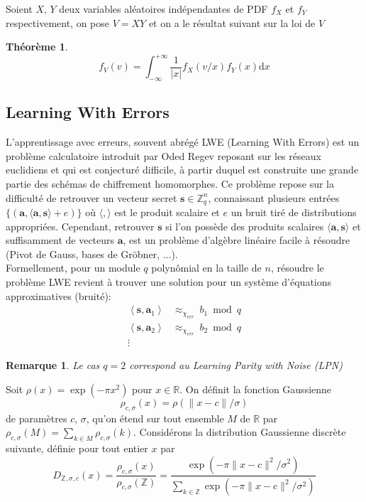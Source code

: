 \documentclass[11pt, headsepline, a4paper, fleqn, oneside]{article}
\newtheorem{theo}{Théorème}
\newtheorem{rem}{Remarque}
\newcommand{\Z}{\mathbb{Z}}
\newcommand{\R}{\mathbb{R}}
\begin{document}
Soient $X,\,Y$ deux variables aléatoires indépendantes de PDF $f_X$ et $f_Y$ respectivement, on pose $V=XY$ et on a le résultat suivant sur la loi de $V$

\begin{theo}
\begin{equation}
    f_V (v) = \int_{-\infty}^{+\infty} \frac{1}{|x|} f_X (v/x)f_Y (x) \mathrm{d}x 
\end{equation}
\end{theo}

\subsection{Learning With Errors}
L'apprentissage avec erreurs, souvent abrégé LWE (Learning With Errors) est un problème calculatoire introduit par Oded Regev \cite{Regev10} reposant sur les réseaux euclidiens et qui est conjecturé difficile, à partir duquel est construite une grande partie des schémas de chiffrement homomorphes.
Ce problème repose sur la difficulté de retrouver un vecteur secret $\boldsymbol{s} \in \Z_q ^n$, connaissant plusieurs entrées $\{(\boldsymbol{a},\langle\boldsymbol{a}, \boldsymbol{s}\rangle+ e)\}$ où $\langle , \rangle$ est le produit scalaire et $e$ un bruit tiré de distributions appropriées. Cependant, retrouver $\boldsymbol{s}$ si l'on possède des produits scalaires $\langle\boldsymbol{a}, \boldsymbol{s}\rangle$ et suffisamment de vecteurs $\boldsymbol{a}$, est un problème d'algèbre linéaire facile à résoudre (Pivot de Gauss, bases de Gröbner, $\dots$). \\
Formellement, pour un module $q$ polynômial en la taille de $n$, résoudre le problème LWE revient à trouver une solution pour un système d'équations approximatives (bruité):
$$
\begin{aligned}\left\langle\boldsymbol{s}, \boldsymbol{a}_{1}\right\rangle & \approx_{\chi_{err}} \ b_{1} \bmod q \\\left\langle\boldsymbol{s}, \boldsymbol{a}_{2}\right\rangle & \approx_{\chi_{err}} \ b_{2} \bmod q \\ \vdots \end{aligned}
$$
\begin{rem}
Le cas $q=2$ correspond au Learning Parity with Noise (LPN)
\end{rem}
Soit $\rho(x)=\exp \left(-\pi x^{2}\right)$ pour $x \in \mathbb{R} .$ On définit la fonction Gaussienne $$\rho_{c, \sigma}(x)=\rho(\|x-c\| / \sigma)$$ de paramètres $c,\,\sigma$, qu'on étend sur tout ensemble $M$ de $\R$ par $\rho_{c, \sigma}(M)=\sum_{k \in M} \rho_{c, \sigma}(k)$.
Considérons la distribution Gaussienne discrète suivante, définie pour tout entier $x$ par
$$
D_{\Z, \sigma, c}(x)=\frac{\rho_{c, \sigma}(x)}{\rho_{c, \sigma}(\Z)} =\frac{\exp \left(-\pi\|x-c\|^{2} / \sigma^{2}\right)}{\sum_{k \in \mathbb{Z}} \exp \left(-\pi\|x-c\|^{2} / \sigma^{2}\right)}
$$
\end{document}
